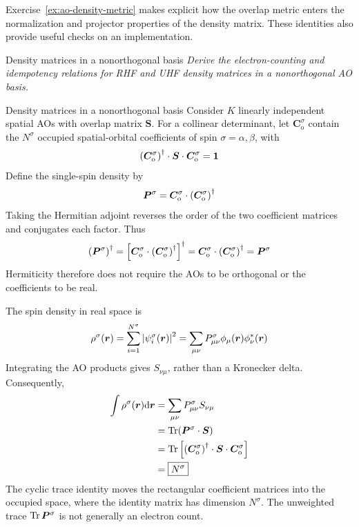 \documentclass[11pt,a4paper,titlepage]{article}
\numberwithin{equation}{section}
\newcommand{\br}{\boldsymbol{r}}
\newcommand{\bC}{\boldsymbol{C}}
\newcommand{\bI}{\boldsymbol{1}}
\newcommand{\bP}{\boldsymbol{P}}
\newcommand{\bS}{\boldsymbol{S}}
\newcommand{\violet}[1]{\textcolor{hfViolet}{#1}}
\begin{document}
Exercise~\ref{ex:ao-density-metric} makes explicit how the overlap metric enters the
normalization and projector properties of the density matrix. These
identities also provide useful checks on an implementation.

\begin{hfexercise}[phantom={\label{ex:ao-density-metric}}]{Density matrices in a nonorthogonal basis}
\violet{\textit{Derive the electron-counting and idempotency relations for
RHF and UHF density matrices in a nonorthogonal AO basis.}}
\end{hfexercise}
\begin{hfsolution}{Density matrices in a nonorthogonal basis}
Consider $K$ linearly independent spatial AOs with overlap matrix $\bS$.
For a collinear determinant, let $\bC_\text{o}^\sigma$ contain the
$N^\sigma$ occupied spatial-orbital coefficients of spin
$\sigma=\alpha,\beta$, with
\begin{equation}
  \qty(\bC_\text{o}^\sigma)^\dag\cdot\bS\cdot\bC_\text{o}^\sigma=\bI
\end{equation}
Define the single-spin density by
\begin{equation}
  \bP^\sigma=\bC_\text{o}^\sigma\cdot
  \qty(\bC_\text{o}^\sigma)^\dag
\end{equation}
Taking the Hermitian adjoint reverses the order of the two coefficient
matrices and conjugates each factor. Thus
\begin{equation}
  \qty(\bP^\sigma)^\dag
  =\qty[\bC_\text{o}^\sigma\cdot
    \qty(\bC_\text{o}^\sigma)^\dag]^\dag
  =\bC_\text{o}^\sigma\cdot
    \qty(\bC_\text{o}^\sigma)^\dag
  =\bP^\sigma
\end{equation}
Hermiticity therefore does not require the AOs to be orthogonal or the
coefficients to be real.

The spin density in real space is
\begin{equation}
  \rho^\sigma(\br)
  =\sum_{i=1}^{N^\sigma}\abs{\psi_i^\sigma(\br)}^2
  =\sum_{\mu\nu}P_{\mu\nu}^\sigma
    \phi_\mu(\br)\phi_\nu^*(\br)
\end{equation}
Integrating the AO products gives $S_{\nu\mu}$, rather than a Kronecker
delta. Consequently,
\begin{equation}
\begin{split}
  \int\rho^\sigma(\br)\dd\br
  &=\sum_{\mu\nu}P_{\mu\nu}^\sigma S_{\nu\mu}\\
  &=\Tr(\bP^\sigma\cdot\bS)\\
  &=\Tr\qty[\qty(\bC_\text{o}^\sigma)^\dag
    \cdot\bS\cdot\bC_\text{o}^\sigma]\\
  &=\boxed{N^\sigma}
\end{split}
\end{equation}
The cyclic trace identity moves the rectangular coefficient matrices into
the occupied space, where the identity matrix has dimension $N^\sigma$.
The unweighted trace $\Tr\bP^\sigma$ is not generally an electron count.


\end{hfsolution}
\end{document}
